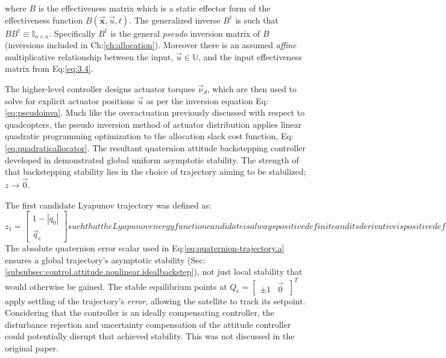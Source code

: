 where $B$ is the effectiveness matrix which is a static effector form of the effectiveness function $B(\vec{\mathbf{x}},\vec{u},t)$. The generalized inverse $B^{\dagger}$ is such that $BB^{\dagger}\equiv\mathbb{I}_{n\times n}$. Specifically $B^{\dagger}$ is the general \emph{pseudo} inversion matrix of $B$ (inversions included in Ch:\ref{ch:allocation}). Moreover there is an assumed \emph{affine} multiplicative relationship between the input, $\vec{u}\in\mathbb{U}$, and the input effectiveness matrix from Eq:\ref{eq:3.4}. 
\par
The higher-level controller designs actuator torques $\vec{\nu}_d$, which are then used to solve for explicit actuator positions $\vec{u}$ as per the inversion equation Eq:\ref{eq:pseudoinva}. Much like the overactuation previously discussed with respect to quadcopters, the pseudo inversion method of actuator distribution applies linear quadratic programming optimization to the allocation slack cost function, Eq:\ref{eq:quadraticallocator}. The resultant quaternion attitude backstepping controller developed in \cite{satellitebackstepping} demonstrated global uniform asymptotic stability. The strength of that backstepping stability lies in the choice of trajectory aiming to be stabilized; $z\rightarrow\vec{0}$. 
\par
The first candidate Lyapunov trajectory was defined as:
\begin{subequations}
\begin{equation}\label{eq:quaternion-trajectory.a}
z_1=\begin{bmatrix}
1-|q_0|\\
\vec{q}_e
\end{bmatrix}
\end{equation}
such that the Lyapunov energy function candidate is always positive definite and its derivative is positive definite descrescent. The particulars of that stability proof are omitted but it is worth detailing their chosen candidate function:
\begin{equation}
V_1(z)=z_1\text{}^Tz_1>0~~~~\forall[q_0,\vec{q}_e]
\end{equation}
\end{subequations}
The absolute quaternion error scalar used in Eq:\ref{eq:quaternion-trajectory.a} ensures a global trajectory's asymptotic stability (Sec:\ref{subsubsec:control.attitude.nonlinear.idealbackstep}), not just local stability that would otherwise be gained. The stable equilibrium points at $Q_e=\begin{bmatrix}
\pm 1 & \vec{0}~
\end{bmatrix}^T$ apply settling of the trajectory's \emph{error}, allowing the satellite to track its setpoint. Considering that the controller is an ideally compensating controller, the disturbance rejection and uncertainty compensation of the attitude controller could potentially disrupt that achieved stability. This was not discussed in the original paper.